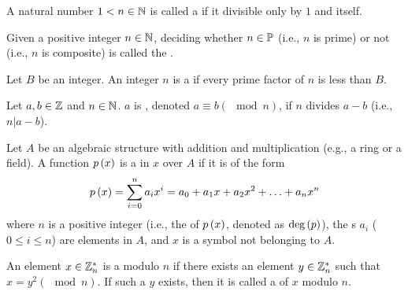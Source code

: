 \begin{defi}
A natural number $1<n\in\mathbb{N}$ is called a  if it divisible only by $1$ and itself.
\cite{Oppliger:2011:CC:2049860}
\end{defi}

\begin{defi}
Given a positive integer $n\in\mathbb{N}$, deciding whether $n\in\mathbb{P}$ (i.e., $n$ is prime) or not (i.e., $n$ is composite) is called the .
\cite{Oppliger:2011:CC:2049860}
\end{defi}

\begin{defi}
Let $B$ be an integer. An integer $n$ is a  if every prime factor of $n$ is less than $B$.
\cite{Oppliger:2011:CC:2049860}
\end{defi}

\begin{defi}
Let $a,b\in\mathbb{Z}$ and $n\in\mathbb{N}$. $a$ is , denoted $a\equiv b \left(\mod n\right)$, if $n$ divides $a-b$ (i.e., $n|a-b$).
\cite{Oppliger:2011:CC:2049860}
\end{defi}

\begin{defi}[Polynomial]
Let $A$ be an algebraic structure with addition and multiplication (e.g., a ring or a field). A function $p\left(x\right)$ is a  in $x$ over $A$ if it is of the form
\begin{equation}
p\left(x\right)=\displaystyle\sum_{i=0}^{n}{a_ix^i}=a_0+a_1x+a_2x^2+\ldots+a_nx^n
\end{equation}
where $n$ is a positive integer (i.e., the  of $p\left(x\right)$, denoted as $\mbox{deg}\left(p\right)$), the s $a_i$ ($0\leq i\leq n$) are elements in $A$, and $x$ is a symbol not belonging to $A$.
\cite{Oppliger:2011:CC:2049860}
\end{defi}

\begin{defi}
An element $x\in\mathbb{Z}^*_n$ is a  modulo $n$ if there exists an element $y\in\mathbb{Z}^*_n$ such that $x=y^2\left(\mod n\right)$. If such a $y$ exists, then it is called a  of $x$ modulo $n$.
\cite{Oppliger:2011:CC:2049860}
\end{defi}

